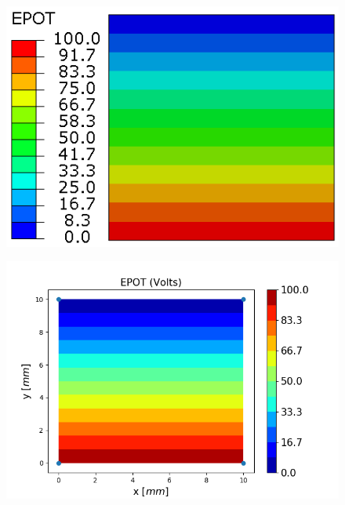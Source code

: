 \documentclass[12pt]{article}
\begin{document}
\begin{figure}[H]
	\centering
	\begin{minipage}{.5\textwidth}
		\centering
		\includegraphics[width=1\linewidth]{E1EPOT.png}
		\label{E1EPOT}
	\end{minipage}%
	\begin{minipage}{.7\textwidth}
		\centering
		\includegraphics[width=1\linewidth]{E1EPOT_IGA.png}
		\label{E1EPOT_IGA}
	\end{minipage}
\end{figure}
\end{document}
